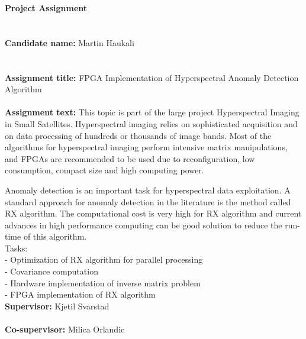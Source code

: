 \newpage

\Huge{\textbf{Project Assignment}}
\\
\\
\\
\small
\textbf{Candidate name: }  Martin Haukali
\\
\\
\\
\textbf{Assignment title:}  FPGA Implementation of Hyperspectral Anomaly Detection Algorithm
\\
\\
\textbf{ Assignment text: }
This topic is part of the large project Hyperspectral Imaging in Small Satellites. Hyperspectral imaging relies
on sophisticated acquisition and on data processing of hundreds or thousands of image bands. Most of the
algorithms for hyperspectral imaging perform intensive matrix manipulations, and
FPGAs are recommended to be used due to reconfiguration, low consumption, compact size and high
computing power.

Anomaly detection is an important task for hyperspectral data exploitation.
A standard approach for anomaly detection in the literature is the method called RX algorithm.
The computational cost is very high for RX algorithm and current advances
in high performance computing can be good solution to reduce the run- time of this algorithm.\\

Tasks:\\
- Optimization of RX algorithm for parallel processing\\
- Covariance computation\\
- Hardware implementation of inverse matrix problem\\
- FPGA implementation of RX algorithm \\


\textbf{Supervisor:  }Kjetil Svarstad 
\\
\\
\textbf{Co-supervisor: }Milica Orlandic